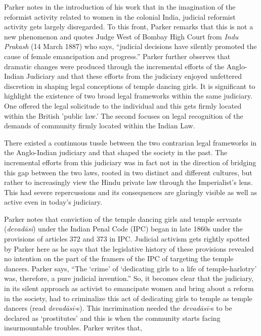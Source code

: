 {Parker notes in the introduction of his work that in the imagination of the reformist activity related to women in the colonial India, judicial reformist activity gets largely disregarded. To this front, Parker remarks that this is not a new phenomenon and quotes Judge West of Bombay High Court from \textit{Indu Prakash} (14 March 1887) who says, “judicial decisions have silently promoted the cause of female emancipation and progress.” Parker further observes that dramatic changes were produced through the incremental efforts of the Anglo-Indian Judiciary and that these efforts from the judiciary enjoyed unfettered discretion in shaping legal conceptions of temple dancing girls. It is significant to highlight the existence of two broad legal frameworks within the same judiciary. One offered the legal solicitude to the individual and this gets firmly located within the British 'public law.’ The second focuses on legal recognition of the demands of community firmly located within the Indian Law.

There existed a continuous tussle between the two contrarian legal frameworks in the Anglo-Indian judiciary and that shaped the society in the past. The incremental efforts from this judiciary was in fact not in the direction of bridging this gap between the two laws, rooted in two distinct and different cultures, but rather to increasingly view the Hindu private law through the Imperialist’s lens. This had severe repercussions and its consequences are glaringly visible as well as active even in today’s judiciary.

Parker notes that conviction of the temple dancing girls and temple servants (\textit{devadāsī}) under the Indian Penal Code (IPC) began in late 1860s under the provisions of articles 372 and 373 in IPC. Judicial activism gets rightly spotted by Parker here as he says that the legislative history of these provisions revealed no intention on the part of the framers of the IPC of targeting the temple dancers. Parker says, “The `crime' of `dedicating girls to a life of temple-harlotry' was, therefore, a pure judicial invention.” So, it becomes clear that the judiciary, in its silent approach as activist to emancipate women and bring about a reform in the society, had to criminalize this act of dedicating girls to temple as temple dancers (read \textit{devadāsī-}s). This incrimination needed the \textit{devadāsī-}s to be declared as ‘prostitutes’ and this is when the community starts facing insurmountable troubles. Parker writes that,

}
